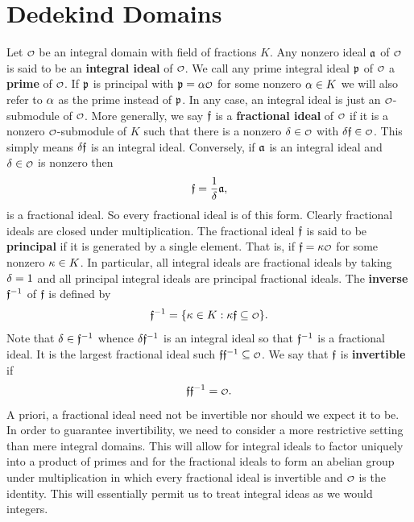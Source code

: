   \section{Dedekind Domains}
    Let \(\smc{O}\) be an integral domain with field of fractions \(K\). Any nonzero ideal \(\mathfrak{a}\) of \(\smc{O}\) is said to be an \textbf{integral ideal} of \(\smc{O}\). We call any prime integral ideal \(\mathfrak{p}\) of \(\smc{O}\) a \textbf{prime} of \(\smc{O}\). If \(\mathfrak{p}\) is principal with \(\mf{p} = \a\smc{O}\) for some nonzero \(\alpha \in K\) we will also refer to \(\alpha\) as the prime instead of \(\mathfrak{p}\). In any case, an integral ideal is just an \(\smc{O}\)-submodule of \(\smc{O}\). More generally, we say \(\mathfrak{f}\) is a \textbf{fractional ideal} of \(\smc{O}\) if it is a nonzero \(\smc{O}\)-submodule of \(K\) such that there is a nonzero \(\d \in \smc{O}\) with \(\d\mf{f} \in \smc{O}\). This simply means \(\delta\mathfrak{f}\) is an integral ideal. Conversely, if \(\mathfrak{a}\) is an integral ideal and \(\d \in \smc{O}\) is nonzero then  
    \[
      \mathfrak{f} = \frac{1}{\delta}\mathfrak{a},
    \]
    is a fractional ideal. So every fractional ideal is of this form. Clearly fractional ideals are closed under multiplication. The fractional ideal \(\mathfrak{f}\) is said to be \textbf{principal} if it is generated by a single element. That is, if \(\mf{f} = \k\smc{O}\) for some nonzero \(\kappa \in K\). In particular, all integral ideals are fractional ideals by taking \(\delta = 1\) and all principal integral ideals are principal fractional ideals. The \textbf{inverse} \(\mathfrak{f}^{-1}\) of \(\mathfrak{f}\) is defined by
    \[
      \mf{f}^{-1} = \{\k \in K:\k\mf{f} \subseteq \smc{O}\}.
    \]
    Note that  \(\delta \in \mathfrak{f}^{-1}\) whence \(\delta\mathfrak{f}^{-1}\) is an integral ideal so that \(\mathfrak{f}^{-1}\) is a fractional ideal. It is the largest fractional ideal such \(\mf{f}\mf{f}^{-1} \subseteq \smc{O}\). We say that \(\mathfrak{f}\) is \textbf{invertible} if
    \[
      \mf{f}\mf{f}^{-1} = \smc{O}.
    \]
    A priori, a fractional ideal need not be invertible nor should we expect it to be. In order to guarantee invertibility, we need to consider a more restrictive setting than mere integral domains. This will allow for integral ideals to factor uniquely into a product of primes and for the fractional ideals to form an abelian group under multiplication in which every fractional ideal is invertible and \(\smc{O}\) is the identity. This will essentially permit us to treat integral ideas as we would integers.
    
